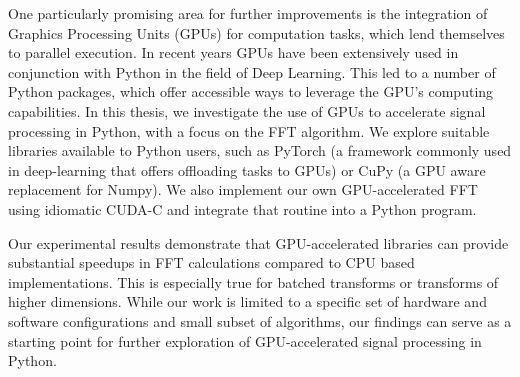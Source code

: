 One particularly promising area for further improvements is the integration of Graphics Processing Units (GPUs) for computation tasks, which lend themselves to parallel execution.
In recent years GPUs have been extensively used in conjunction with Python in the field of Deep Learning.
This led to a number of Python packages, which offer accessible ways to leverage the GPU's computing capabilities.
In this thesis, we investigate the use of GPUs to accelerate signal processing in Python, with a focus on the FFT algorithm.
We explore suitable libraries available to Python users, such as PyTorch (a framework commonly used in deep-learning that offers offloading tasks to GPUs) or CuPy (a GPU aware replacement for Numpy).
We also implement our own GPU-accelerated FFT using idiomatic CUDA-C and integrate that routine into a Python program.

Our experimental results demonstrate that GPU-accelerated libraries can provide substantial speedups in FFT calculations compared to CPU based implementations.
This is especially true for batched transforms or transforms of higher dimensions.
While our work is limited to a specific set of hardware and software configurations and small subset of algorithms, our findings can serve as a starting point for further exploration of GPU-accelerated signal processing in Python.
\newpage
\setcounter{tocdepth}{4}
\setcounter{secnumdepth}{4}
\tableofcontents
\renewcommand{\arraystretch}{2} %

\newpage

%
\printglossary[type=\acronymtype, style=mcolindex, title={List of Acronyms}]


\renewcommand{\arraystretch}{1.1} %

\newpage
\fancyhead[L]{\rightmark}
\setcounter{page}{1} 

